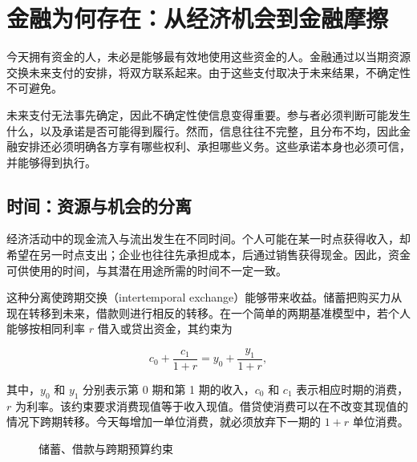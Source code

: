 \section{金融为何存在：从经济机会到金融摩擦}

今天拥有资金的人，未必是能够最有效地使用这些资金的人。金融通过以当期资源交换未来支付的安排，将双方联系起来。由于这些支付取决于未来结果，不确定性不可避免。

未来支付无法事先确定，因此不确定性使信息变得重要。参与者必须判断可能发生什么，以及承诺是否可能得到履行。然而，信息往往不完整，且分布不均，因此金融安排还必须明确各方享有哪些权利、承担哪些义务。这些承诺本身也必须可信，并能够得到执行。

\subsection{时间：资源与机会的分离}

经济活动中的现金流入与流出发生在不同时间。个人可能在某一时点获得收入，却希望在另一时点支出；企业也往往先承担成本，后通过销售获得现金。因此，资金可供使用的时间，与其潜在用途所需的时间不一定一致。

这种分离使跨期交换（intertemporal exchange）能够带来收益。储蓄把购买力从现在转移到未来，借款则进行相反的转移。在一个简单的两期基准模型中，若个人能够按相同利率 $r$ 借入或贷出资金，其约束为

\begin{equation}
c_0+\frac{c_1}{1+r}=y_0+\frac{y_1}{1+r},
\label{eq:ch1_intertemporal_budget}
\end{equation}

其中，$y_0$ 和 $y_1$ 分别表示第 0 期和第 1 期的收入，$c_0$ 和 $c_1$ 表示相应时期的消费，$r$ 为利率。该约束要求消费现值等于收入现值。借贷使消费可以在不改变其现值的情况下跨期转移。今天每增加一单位消费，就必须放弃下一期的 $1+r$ 单位消费。

\begin{figure}[H]
\centering
{}
\caption{储蓄、借款与跨期预算约束}
\label{fig:ch1-intertemporal-budget}
\end{figure}

